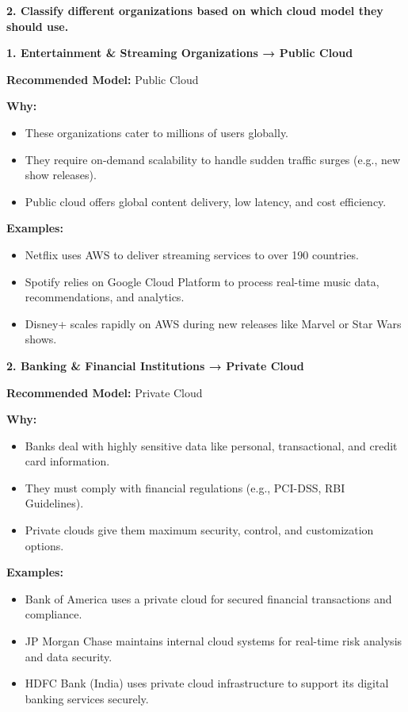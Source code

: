 \documentclass[12pt]{article}
\begin{document}
\textbf{2. Classify different organizations based on which cloud model
they should use.}

\textbf{1. Entertainment \& Streaming Organizations → Public Cloud}

\textbf{Recommended Model:} Public Cloud

\textbf{Why:}

\begin{itemize}
\item
  These organizations cater to millions of users globally.
\item
  They require on-demand scalability to handle sudden traffic surges
  (e.g., new show releases).
\item
  Public cloud offers global content delivery, low latency, and cost
  efficiency.
\end{itemize}

\textbf{Examples:}

\begin{itemize}
\item
  Netflix uses AWS to deliver streaming services to over 190 countries.
\item
  Spotify relies on Google Cloud Platform to process real-time music
  data, recommendations, and analytics.
\item
  Disney+ scales rapidly on AWS during new releases like Marvel or Star
  Wars shows.
\end{itemize}

\textbf{2. Banking \& Financial Institutions → Private Cloud}

\textbf{Recommended Model:} Private Cloud

\textbf{Why:}

\begin{itemize}
\item
  Banks deal with highly sensitive data like personal, transactional,
  and credit card information.
\item
  They must comply with financial regulations (e.g., PCI-DSS, RBI
  Guidelines).
\item
  Private clouds give them maximum security, control, and customization
  options.
\end{itemize}

\textbf{Examples:}

\begin{itemize}
\item
  Bank of America uses a private cloud for secured financial
  transactions and compliance.
\item
  JP Morgan Chase maintains internal cloud systems for real-time risk
  analysis and data security.
\item
  HDFC Bank (India) uses private cloud infrastructure to support its
  digital banking services securely.
\end{itemize}
\end{document}
